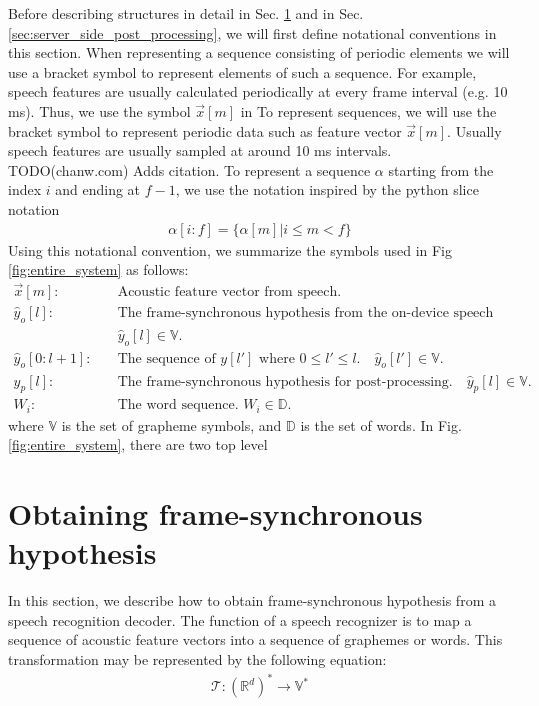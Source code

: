 \documentclass{article}
\begin{document}
Before describing structures in detail in Sec.
\ref{sec:frame_synchronous_hypothesis} and in Sec.
\ref{sec:server_side_post_processing}, we will first define notational 
conventions in this section. When representing a sequence consisting of 
periodic elements we will use a bracket symbol to represent elements of
such a sequence. For example, speech features are usually calculated 
periodically at every frame interval (e.g. 10 ms). Thus, we use  
the symbol $\vec{x}[m]$ in
To represent sequences, we will use the bracket symbol
to represent periodic data such as feature vector $\vec{x}[m]$. Usually
speech features are usually sampled at around 10 ms intervals. TODO(chanw.com)
Adds citation. To represent a sequence $\alpha$ starting from the index 
$i$ and ending at $f-1$, we use the notation inspired by the python slice 
notation 
\begin{align}
  \alpha[i:f] = \{ \alpha[m]| i \le m < f \} 
\end{align}
Using this notational convention, we summarize the symbols used in Fig
\ref{fig:entire_system} as follows:
\begin{align}
  \vec{x}[m]:& \quad \text{Acoustic feature vector from speech.}  \nonumber \\
  \hat{y}_o[l]:& \quad \text{The frame-synchronous hypothesis from the
  on-device speech recognizer.}   \nonumber \\
       & \quad \hat{y}_o[l] \in \mathbb{V}.  \nonumber \\
  \hat{y}_o[0:l+1]  : & \quad \text{The sequence of $y[l']$ where } 0 \le l'
  \le l. \quad  \hat{y}_o[l'] \in \mathbb{V}.  \nonumber \\ 
  y_p[l]:& \quad \text{The frame-synchronous hypothesis for post-processing.}
  \quad \hat{y}_p[l] \in \mathbb{V}.   \nonumber \\
  W_i: & \quad \text{The word sequence. } W_i \in  \mathbb{D}.  \nonumber 
\end{align}
where $\mathbb{V}$ is the set of grapheme symbols, and $\mathbb{D}$ is the
set of words. In Fig. \ref{fig:entire_system}, there are two top level


\section{Obtaining frame-synchronous hypothesis}
\label{sec:frame_synchronous_hypothesis}

In this section, we describe how to obtain frame-synchronous  
hypothesis from a speech recognition decoder. The function of a speech
recognizer is to map a sequence of acoustic feature vectors into
a sequence of graphemes or words. This transformation may be represented 
by the following equation:
\begin{align}
  \mathcal{T} : \left(\mathbb{R}^d\right)^{*} \rightarrow \mathbb{V}^{*}
	\label{eq:transformation}
\end{align}
\end{document}
